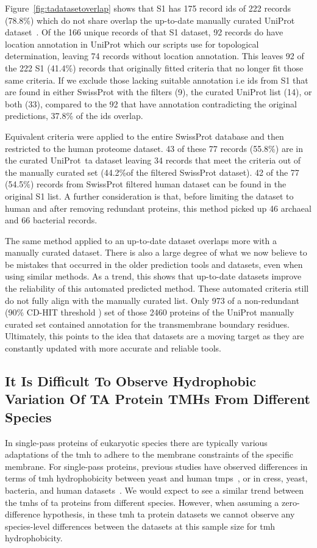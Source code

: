 Figure~\ref{fig:tadatasetoverlap} shows that S1 has 175 record ids of 222 records (78.8\%) which do not share overlap the up-to-date manually curated UniProt dataset~\cite{TheUniProtConsortium2014}.
Of the 166 unique records of that S1 dataset, 92 records do have location annotation in UniProt which our scripts use for topological determination, leaving 74 records without location annotation.
This leaves 92 of the 222 S1 (41.4\%) records that originally fitted criteria that no longer fit those same criteria.
If we exclude those lacking suitable annotation i.e ids from S1 that are found in either SwissProt with the filters (9), the curated UniProt list (14), or both (33), compared to the 92 that have annotation contradicting the original predictions, 37.8\% of the ids overlap.

Equivalent criteria were applied to the entire SwissProt database and then restricted to the human proteome dataset.
43 of these 77 records (55.8\%) are in the curated UniProt~\gls{ta}  dataset leaving 34 records that meet the criteria out of the manually curated set (44.2\%of the filtered SwissProt dataset).
42 of the 77 (54.5\%) records from SwissProt filtered human dataset can be found in the original S1 list.
A further consideration is that, before limiting the dataset to human and after removing redundant proteins, this method picked up  46 archaeal and 66 bacterial records.

The same method applied to an up-to-date dataset overlaps more with a manually curated dataset.
There is also a large degree of what we now believe to be mistakes that occurred in the older prediction tools and datasets, even when using similar methods.
As a trend, this shows that up-to-date datasets improve the reliability of this automated predicted method.
These automated criteria still do not fully align with the manually curated list.
Only 973 of a non-redundant (90\% CD-HIT threshold \cite{Huang2010, Wu2011}) set of those 2460 proteins of the UniProt manually curated set contained annotation for the transmembrane boundary residues.
Ultimately, this points to the idea that datasets are a moving target as they are constantly updated with more accurate and reliable tools.

\subsection{It Is Difficult To Observe Hydrophobic Variation Of TA Protein TMHs From Different Species}

In single-pass proteins of eukaryotic species there are typically various adaptations of the \gls{tmh} to adhere to the membrane constraints of the specific membrane.
For single-pass proteins, previous studies have observed differences in terms of \gls{tmh} hydrophobicity between yeast and human \gls{tmp}s~\cite{Sharpe2010}, or in cress, yeast, bacteria, and human datasets~\cite{Baker2017}.
We would expect to see a similar trend between the \gls{tmh}s of \gls{ta} proteins from different species.
However, when assuming a zero-difference hypothesis, in these \gls{tmh} \gls{ta} protein datasets we cannot observe any species-level differences between the datasets at this sample size for \gls{tmh} hydrophobicity.

